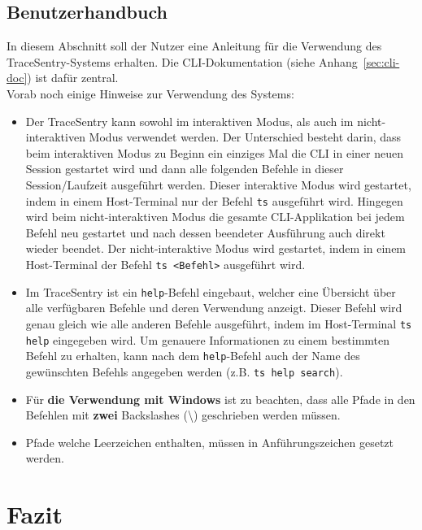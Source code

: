 \documentclass[a4paper,12pt]{report}
\begin{document}
    \clearpage


    \section{Benutzerhandbuch}
    \label{sec:user-manual}
    In diesem Abschnitt soll der Nutzer eine Anleitung für die Verwendung des TraceSentry-Systems erhalten.
    Die CLI-Dokumentation (siehe Anhang~\ref{sec:cli-doc}) ist dafür zentral.
    \\
    Vorab noch einige Hinweise zur Verwendung des Systems:
    \begin{itemize}
        \item Der TraceSentry kann sowohl im interaktiven Modus, als auch im nicht-interaktiven Modus verwendet werden.
        Der Unterschied besteht darin, dass beim interaktiven Modus zu Beginn ein einziges Mal die CLI in einer neuen Session gestartet wird und
        dann alle folgenden Befehle in dieser Session/Laufzeit ausgeführt werden.
        Dieser interaktive Modus wird gestartet, indem in einem Host-Terminal nur der Befehl \texttt{ts} ausgeführt wird.
        Hingegen wird beim nicht-interaktiven Modus die gesamte CLI-Applikation bei jedem Befehl neu gestartet und nach dessen beendeter Ausführung auch direkt wieder beendet.
        Der nicht-interaktive Modus wird gestartet, indem in einem Host-Terminal der Befehl \texttt{ts <Befehl>} ausgeführt wird.
        \item Im TraceSentry ist ein \texttt{help}-Befehl eingebaut, welcher eine Übersicht über alle verfügbaren Befehle und deren Verwendung anzeigt.
        Dieser Befehl wird genau gleich wie alle anderen Befehle ausgeführt, indem im Host-Terminal \texttt{ts help} eingegeben wird.
        Um genauere Informationen zu einem bestimmten Befehl zu erhalten, kann nach dem \texttt{help}-Befehl auch der Name des gewünschten Befehls angegeben werden (z.B. \texttt{ts help search}).
        \item Für \textbf{die Verwendung mit Windows} ist zu beachten, dass alle Pfade in den Befehlen mit \textbf{zwei} Backslashes (\textbackslash) geschrieben werden müssen.
        \item Pfade welche Leerzeichen enthalten, müssen in Anführungszeichen gesetzt werden.
    \end{itemize}


    \chapter{Fazit}
\end{document}

